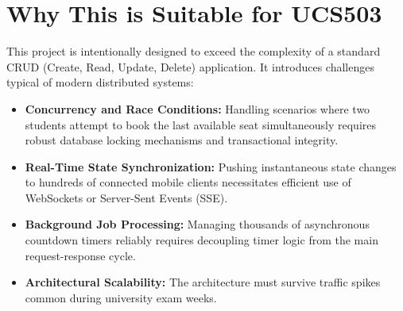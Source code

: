 \documentclass[11pt,a4paper]{article}
\begin{document}
\section{Why This is Suitable for UCS503}
This project is intentionally designed to exceed the complexity of a standard CRUD (Create, Read, Update, Delete) application. It introduces challenges typical of modern distributed systems:
\begin{itemize}[leftmargin=0.7cm]
    \item \textbf{Concurrency and Race Conditions:} Handling scenarios where two students attempt to book the last available seat simultaneously requires robust database locking mechanisms and transactional integrity.
    \item \textbf{Real-Time State Synchronization:} Pushing instantaneous state changes to hundreds of connected mobile clients necessitates efficient use of WebSockets or Server-Sent Events (SSE).
    \item \textbf{Background Job Processing:} Managing thousands of asynchronous countdown timers reliably requires decoupling timer logic from the main request-response cycle.
    \item \textbf{Architectural Scalability:} The architecture must survive traffic spikes common during university exam weeks.
\end{itemize}
\end{document}
